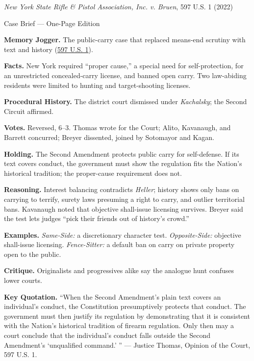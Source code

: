 \documentclass[12pt]{article}
\begin{document}
\begin{center}
{\Large \textit{New York State Rifle \& Pistol Association, Inc. v. Bruen}, 597 U.S. 1 (2022)\par}
\vspace{0.3em}
{\normalsize Case Brief --- One-Page Edition\par}
\end{center}

\textbf{Memory Jogger.} The public-carry case that replaced means-end scrutiny with text and history (\href{https://www.law.cornell.edu/supremecourt/text/20-843}{597 U.S. 1}).

\textbf{Facts.} New York required ``proper cause,'' a special need for self-protection, for an unrestricted concealed-carry license, and banned open carry. Two law-abiding residents were limited to hunting and target-shooting licenses.

\textbf{Procedural History.} The district court dismissed under \textit{Kachalsky}; the Second Circuit affirmed.

\textbf{Votes.} Reversed, 6--3. Thomas wrote for the Court; Alito, Kavanaugh, and Barrett concurred; Breyer dissented, joined by Sotomayor and Kagan.

\textbf{Holding.} The Second Amendment protects public carry for self-defense. If its text covers conduct, the government must show the regulation fits the Nation's historical tradition; the proper-cause requirement does not.

\textbf{Reasoning.} Interest balancing contradicts \textit{Heller}; history shows only bans on carrying to terrify, surety laws presuming a right to carry, and outlier territorial bans. Kavanaugh noted that objective shall-issue licensing survives. Breyer said the test lets judges ``pick their friends out of history's crowd.''

\textbf{Examples.} \emph{Same-Side:} a discretionary character test. \emph{Opposite-Side:} objective shall-issue licensing. \emph{Fence-Sitter:} a default ban on carry on private property open to the public.

\textbf{Critique.} Originalists and progressives alike say the analogue hunt confuses lower courts.

\textbf{Key Quotation.} ``When the Second Amendment's plain text covers an individual's conduct, the Constitution presumptively protects that conduct. The government must then justify its regulation by demonstrating that it is consistent with the Nation's historical tradition of firearm regulation. Only then may a court conclude that the individual's conduct falls outside the Second Amendment's `unqualified command.' '' --- Justice Thomas, Opinion of the Court, 597 U.S. 1.
\end{document}
